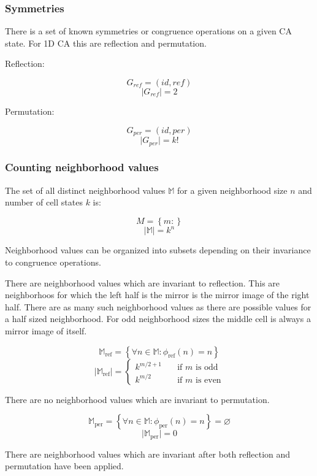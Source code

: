 \documentclass{ijuc}
\begin{document}
\subsubsection{Symmetries}

There is a set of known symmetries or congruence operations on a given CA state.
For 1D CA this are reflection and permutation.

Reflection:

\[ G_{ref} = (id, ref) \]
\[ \vert G_{ref} \vert = 2 \]

Permutation:

\[ G_{per} = (id, per) \]
\[ \vert G_{per} \vert = k! \]

\subsubsection{Counting neighborhood values}

The set of all distinct neighborhood values $\mathbb{M}$ for a given neighborhood size $n$ and
number of cell states $k$ is:

\[ M = \left\{ m : \right\} \]
\[ \vert \mathbb{M} \vert = k^n \]

Neighborhood values can be organized into subsets depending on their invariance to congruence operations.

There are neighborhood values which are invariant to reflection. This are neighborhoos for which the
left half is the mirror is the mirror image of the right half. There are as many such neighborhood
values as there are possible values for a half sized neighborhood. For odd neighborhood sizes the middle
cell is always a mirror image of itself.

\[ \mathbb{M}_\mathrm{ref} = \left\{ \forall n \in \mathbb{M} : \phi_\mathrm{ref}(n) = n \right\} \]
\[ \vert \mathbb{M}_\mathrm{ref} \vert = \left\{ 
  \begin{array}{ll}
    {k^{m/2+1}} & \quad \textrm{if $m$ is odd }\\
    {k^{m/2  }} & \quad \textrm{if $m$ is even}
  \end{array} \right.
\]

There are no neighborhood values which are invariant to permutation.

\[ \mathbb{M}_\mathrm{per} = \left\{ \forall n \in \mathbb{M} : \phi_\mathrm{per}(n) = n \right\} = \varnothing \]
\[ \vert \mathbb{M}_\mathrm{per} \vert = 0 \]

There are neighborhood values which are invariant after both reflection and permutation have been applied.
\end{document}
